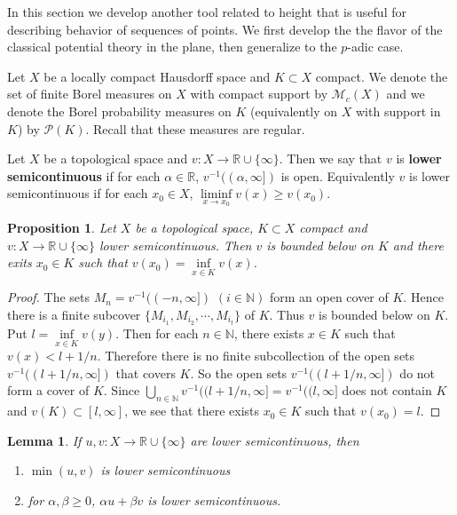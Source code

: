 \documentclass[12pt]{amsart}
\newtheorem{lem}[thm]{Lemma}
\newtheorem{prop}[thm]{Proposition}
\theoremstyle{definition}
\theoremstyle{remark}
\theoremstyle{definition}
\newcommand{\R}{\mathbb{R}}
\newcommand{\N}{\mathbb{N}}
\newcommand{\MCM}{\mathcal{M}}
\begin{document}
In this section we develop another tool related to height that is useful for describing behavior of sequences of points. We first develop the the flavor of the classical potential theory in the plane, then generalize to the $p$-adic case.

Let $X$ be a locally compact Hausdorff space and $K \subset X$ compact. We denote the set of finite Borel measures on $X$ with compact support by $\MCM_c(X)$ and we denote the Borel probability measures on $K$ (equivalently on $X$ with support in $K$) by $\mathcal{P}(K)$. Recall that these measures are regular.

Let $X$ be a topological space and $v:X \rightarrow \R\cup \{ \infty \}$. Then we say that $v$ is \textbf{lower semicontinuous} if for each $\alpha \in \R$, $v^{-1}((\alpha,\infty])$ is open. Equivalently $v$ is lower semicontinuous if for each $x_0 \in X$, $\liminf\limits_{x \rightarrow x_0}v(x) \geq v(x_0)$.

\begin{prop}

Let $X$ be a topological space, $K \subset X$ compact and $v:X \rightarrow \R\cup \{ \infty \}$ lower semicontinuous. Then $v$ is bounded below on $K$ and there exits $x_0 \in K$ such that $v(x_0) = \inf\limits_{x \in K}v(x)$.

\end{prop}

\begin{proof}

The sets $M_n = v^{-1}((-n,\infty])$ $(i \in \N)$ form an open cover of $K$. Hence there is a finite subcover $\{M_{i_1}, M_{i_2}, \cdots, M_{i_t}\}$ of $K$. Thus $v$ is bounded below on $K$. Put $l = \inf\limits_{x \in K}v(y)$. Then for each $n \in \N$, there exists $x \in K$ such that $v(x) < l+1/n$. Therefore there is no finite subcollection of the open sets $v^{-1}((l+1/n,\infty])$ that covers $K$. So the open sets $v^{-1}((l+1/n,\infty])$ do not form a cover of $K$. Since $\bigcup\limits_{n \in \N}v^{-1}((l+1/n,\infty] = v^{-1}((l,\infty]$ does not contain $K$ and $v(K) \subset [l, \infty]$, we see that there exists $x_0 \in K$ such that $v(x_0) = l$. 

\end{proof}

\begin{lem}

If $u,v:X \rightarrow \R\cup \{\infty\}$ are lower semicontinuous, then 

\begin{enumerate}
\item $\min(u,v)$ is lower semicontinuous
\item for $\alpha, \beta \geq 0$, $\alpha u + \beta v$ is lower semicontinuous.
\end{enumerate} 

\end{lem}
\end{document}
